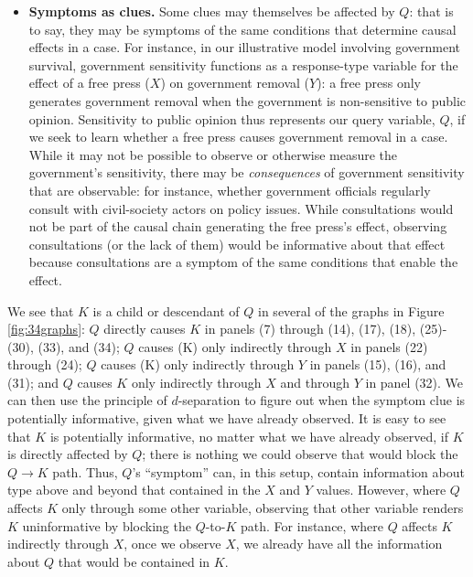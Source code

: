 \documentclass[12pt,]{book}
\providecommand{\tightlist}{%
  \setlength{\itemsep}{0pt}\setlength{\parskip}{0pt}}
\begin{document}
\begin{itemize}
\tightlist
\item
  \textbf{Symptoms as clues.} Some clues may themselves be affected by \(Q\): that is to say, they may be symptoms of the same conditions that determine causal effects in a case. For instance, in our illustrative model involving government survival, government sensitivity functions as a response-type variable for the effect of a free press (\(X\)) on government removal (\(Y\)): a free press only generates government removal when the government is non-sensitive to public opinion. Sensitivity to public opinion thus represents our query variable, \(Q\), if we seek to learn whether a free press causes government removal in a case. While it may not be possible to observe or otherwise measure the government's sensitivity, there may be \emph{consequences} of government sensitivity that are observable: for instance, whether government officials regularly consult with civil-society actors on policy issues. While consultations would not be part of the causal chain generating the free press's effect, observing consultations (or the lack of them) would be informative about that effect because consultations are a symptom of the same conditions that enable the effect.
\end{itemize}

We see that \(K\) is a child or descendant of \(Q\) in several of the graphs in Figure \ref{fig:34graphs}: \(Q\) directly causes \(K\) in panels (7) through (14), (17), (18), (25)-(30), (33), and (34); \(Q\) causes (K) only indirectly through \(X\) in panels (22) through (24); \(Q\) causes (K) only indirectly through \(Y\) in panels (15), (16), and (31); and \(Q\) causes \(K\) only indirectly through \(X\) and through \(Y\) in panel (32). We can then use the principle of \(d\)-separation to figure out when the symptom clue is potentially informative, given what we have already observed. It is easy to see that \(K\) is potentially informative, no matter what we have already observed, if \(K\) is directly affected by \(Q\); there is nothing we could observe that would block the \(Q \rightarrow K\) path. Thus, \(Q\)'s ``symptom'' can, in this setup, contain information about type above and beyond that contained in the \(X\) and \(Y\) values. However, where \(Q\) affects \(K\) only through some other variable, observing that other variable renders \(K\) uninformative by blocking the \(Q\)-to-\(K\) path. For instance, where \(Q\) affects \(K\) indirectly through \(X\), once we observe \(X\), we already have all the information about \(Q\) that would be contained in \(K\).
\end{document}
